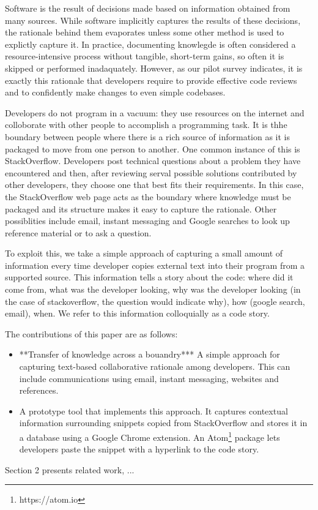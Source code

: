 \documentclass[../manifest.tex]{subfiles}
\begin{document}
Software is the result of decisions made based on information obtained from many sources. While software implicitly captures the results of these decisions, the rationale behind them evaporates unless some other method is used to explictly capture it. In practice, documenting knowlegde is often considered a resource-intensive process without tangible, short-term gains, so often it is skipped or performed inadaquately\cite{OZ:2008,NH:2007}. However, as our pilot survey indicates, it is exactly this rationale that developers require to provide effective code reviews and to confidently make changes to even simple codebases.

Developers do not program in a vacuum: they use resources on the internet and colloborate with other people to accomplish a programming task. It is thhe boundary between people where there is a rich source of information as it is packaged to move from one person to another. One common instance of this is StackOverflow. Developers post technical questions about a problem they have encountered and then, after reviewing serval possible solutions contributed by other developers, they choose one that best fits their requirements. In this case, the StackOverflow web page acts as the boundary where knowledge must be packaged and its structure makes it easy to capture the rationale. Other possiblities include email, instant messaging and Google searches to look up reference material or to ask a question.

To exploit this, we take a simple approach of capturing a small amount of information every time developer copies external text into their program from a supported source. This information tells a story about the code: where did it come from, what was the developer looking, why was the developer looking (in the case of stackoverflow, the question would indicate why), how (google search, email), when. We refer to this information colloquially as a code story.

The contributions of this paper are as follows:
\begin{itemize}
  \item **Transfer of knowledge across a bouandry*** A simple approach for capturing text-based collaborative rationale among
  developers. This can include communications using email, instant messaging,
  websites and references.
  \item A prototype tool that implements this approach. It captures contextual
  information surrounding snippets copied from StackOverflow and stores it in a
  database using a Google Chrome extension. An Atom\footnote{https://atom.io}
  package lets developers paste the snippet with a hyperlink to the code story.
\end{itemize}

Section 2 presents related work, ...
\end{document}
